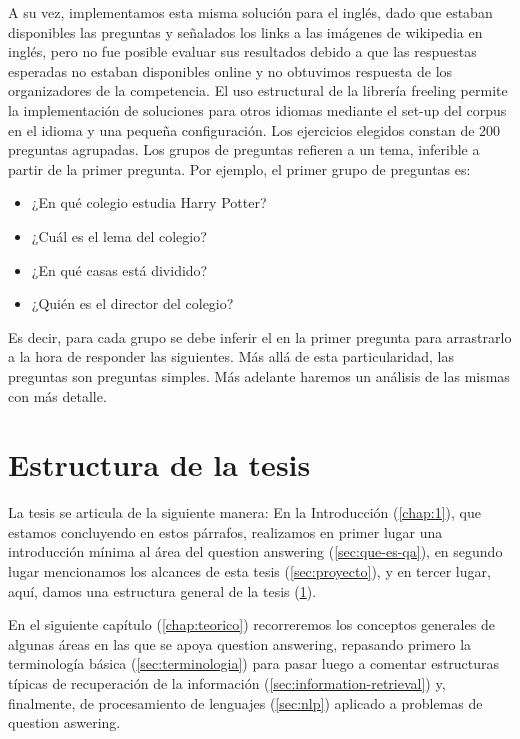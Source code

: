 A su vez, implementamos esta misma solución para el inglés, dado que estaban disponibles las preguntas y señalados los links a las imágenes de wikipedia en inglés, pero no fue posible evaluar sus resultados debido a que las respuestas esperadas no estaban disponibles online y no obtuvimos respuesta de los organizadores de la competencia. El uso estructural de la librería freeling permite la implementación de soluciones para otros idiomas mediante el set-up del corpus en el idioma y una pequeña configuración.
Los ejercicios elegidos constan de 200 preguntas agrupadas. Los grupos de preguntas refieren a un tema, inferible a partir de la primer pregunta.
Por ejemplo, el primer grupo de preguntas es:
\begin{itemize}
\item ¿En qué colegio estudia Harry Potter?
\item ¿Cuál es el lema del colegio?
\item ¿En qué casas está dividido?
\item ¿Quién es el director del colegio?
\end{itemize}
Es decir, para cada grupo se debe inferir el  en la primer pregunta para arrastrarlo a la hora de responder las siguientes. Más allá de esta particularidad, las preguntas son preguntas simples. Más adelante haremos un análisis de las mismas con más detalle.



\section{Estructura de la tesis}
\label{sec:estructura}

La tesis se articula de la siguiente manera: En la Introducción (\ref{chap:1}), que estamos concluyendo en estos párrafos, realizamos en primer lugar una introducción mínima al área del question answering (\ref{sec:que-es-qa}), en segundo lugar mencionamos los alcances de esta tesis (\ref{sec:proyecto}), y en tercer lugar, aquí, damos una estructura general de la tesis (\ref{sec:estructura}).

En el siguiente capítulo (\ref{chap:teorico}) recorreremos los conceptos generales de algunas áreas en las que se apoya question answering, repasando primero la terminología básica (\ref{sec:terminologia}) para pasar luego a comentar estructuras típicas de recuperación de la información (\ref{sec:information-retrieval}) y, finalmente, de procesamiento de lenguajes (\ref{sec:nlp}) aplicado a problemas de question aswering.

